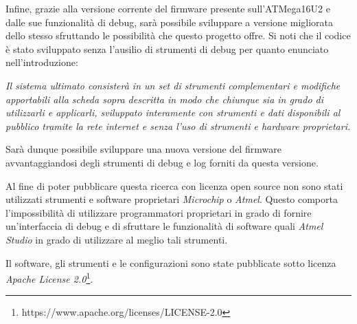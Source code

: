 Infine, grazie alla versione corrente del firmware presente sull'ATMega16U2 e dalle sue funzionalità di debug, sarà possibile sviluppare a versione migliorata dello stesso sfruttando le possibilità che questo progetto offre. Si noti che il codice è stato sviluppato senza l'ausilio di strumenti di debug per quanto enunciato nell'introduzione:
\begin{center}
    \textit{Il sistema ultimato consisterà in un set di strumenti complementari e modifiche apportabili alla scheda sopra descritta in modo che chiunque sia in grado di utilizzarli e applicarli, sviluppato interamente con strumenti e dati disponibili al pubblico tramite la rete internet e senza l'uso di strumenti e hardware proprietari.}
\end{center}

Sarà dunque possibile sviluppare una nuova versione del firmware avvantaggiandosi degli strumenti di debug e log forniti da questa versione.

Al fine di poter pubblicare questa ricerca con licenza open source non sono stati utilizzati strumenti e software proprietari \textit{Microchip} o \textit{Atmel}. Questo comporta l'impossibilità di utilizzare programmatori proprietari in grado di fornire un'interfaccia di debug e di sfruttare le funzionalità di software quali \textit{Atmel Studio} in grado di utilizzare al meglio tali strumenti.

Il software, gli strumenti e le configurazioni sono state pubblicate sotto licenza \textit{Apache License 2.0}\footnote{https://www.apache.org/licenses/LICENSE-2.0}.